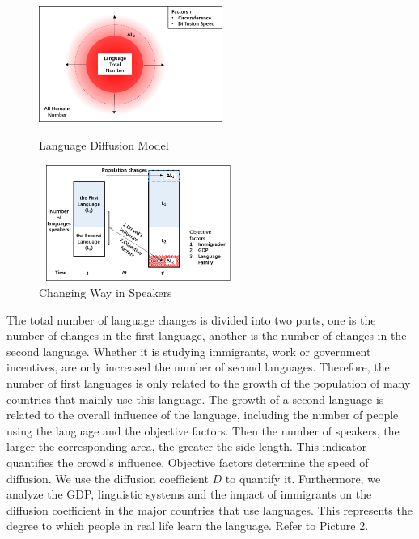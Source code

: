 \documentclass{mcmthesis}
\begin{document}
    \begin{figure}[h]
      \begin{minipage}[t]{0.5\linewidth}
      \centering
      \includegraphics[height=3.8cm,width=6cm]{p1.png}%
      \caption{Language Diffusion Model}
      \label{p1}
      \end{minipage}
      \begin{minipage}[t]{0.5\linewidth}
      \centering
      \includegraphics[height=3.8cm,width=6.3cm]{p2.png}%
      \caption{Changing Way in Speakers}
      \label{p2}
      \end{minipage}
    \end{figure}


    The total number of language changes is divided into two parts, one is the number of changes in the first language, another is the number of changes in the second language.
    Whether it is studying immigrants, work or government incentives, are only increased the number of second languages.
    Therefore, the number of first languages is only related to the growth of the population of many countries that mainly use this language.
    The growth of a second language is related to the overall influence of the language, including the number of people using the language and the objective factors.
    Then the number of speakers, the larger the corresponding area, the greater the side length.
    This indicator quantifies the crowd's influence.
    Objective factors determine the speed of diffusion.
    We use the diffusion coefficient $D$ to quantify it.
    Furthermore, we analyze the GDP, linguistic systems and the impact of immigrants on the diffusion coefficient in the major countries that use languages.
    This represents the degree to which people in real life learn the language.
    Refer to Picture 2.
\end{document}
